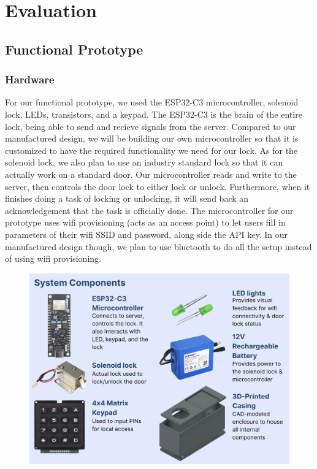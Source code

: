 \newpage
\section{Evaluation}

\subsection{Functional Prototype}


\subsubsection{Hardware}

For our functional prototype, we used the ESP32-C3 microcontroller, solenoid lock, LEDs, transistors, and a keypad. The ESP32-C3 is the brain of the entire lock, being able to send and recieve signals from the server. Compared to our manufactured design, we will be building our own microcontroller so that it is customized to have the required functionality we need for our lock. As for the solenoid lock, we also plan to use an industry standard lock so that it can actually work on a standard door. Our microcontroller reads and write to the server, then controls the door lock to either lock or unlock. Furthermore, when it finishes doing a task of locking or unlocking, it will send back an acknowledgement that the task is officially done. The microcontroller for our prototype uses wifi provisioning (acts as an access point) to let users fill in parameters of their wifi SSID and password, along side the API key. In our manufactured design though, we plan to use bluetooth to do all the setup instead of using wifi provisioning.

\begin{figure}[!ht]
    \centering
    \includegraphics[width=1\textwidth]{img/hardwareComponents.png}
    \label{fig:hardwareComponents}
\end{figure}

